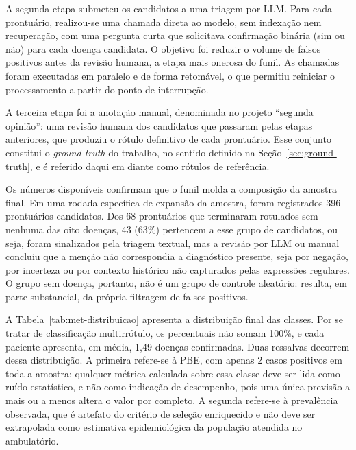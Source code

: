 A segunda etapa submeteu os candidatos a uma triagem por LLM. Para cada prontuário, realizou-se uma chamada direta ao modelo, sem indexação nem recuperação, com uma pergunta curta que solicitava confirmação binária (sim ou não) para cada doença candidata. O objetivo foi reduzir o volume de falsos positivos antes da revisão humana, a etapa mais onerosa do funil. As chamadas foram executadas em paralelo e de forma retomável, o que permitiu reiniciar o processamento a partir do ponto de interrupção.

A terceira etapa foi a anotação manual, denominada no projeto ``segunda opinião'': uma revisão humana dos candidatos que passaram pelas etapas anteriores, que produziu o rótulo definitivo de cada prontuário. Esse conjunto constitui o \textit{ground truth} do trabalho, no sentido definido na Seção~\ref{sec:ground-truth}, e é referido daqui em diante como rótulos de referência.

Os números disponíveis confirmam que o funil molda a composição da amostra final. Em uma rodada específica de expansão da amostra, foram registrados 396 prontuários candidatos. Dos 68 prontuários que terminaram rotulados sem nenhuma das oito doenças, 43 (63\%) pertencem a esse grupo de candidatos, ou seja, foram sinalizados pela triagem textual, mas a revisão por LLM ou manual concluiu que a menção não correspondia a diagnóstico presente, seja por negação, por incerteza ou por contexto histórico não capturados pelas expressões regulares. O grupo sem doença, portanto, não é um grupo de controle aleatório: resulta, em parte substancial, da própria filtragem de falsos positivos.

A Tabela~\ref{tab:met-distribuicao} apresenta a distribuição final das classes. Por se tratar de classificação multirrótulo, os percentuais não somam 100\%, e cada paciente apresenta, em média, 1,49 doenças confirmadas. Duas ressalvas decorrem dessa distribuição. A primeira refere-se à PBE, com apenas 2 casos positivos em toda a amostra: qualquer métrica calculada sobre essa classe deve ser lida como ruído estatístico, e não como indicação de desempenho, pois uma única previsão a mais ou a menos altera o valor por completo. A segunda refere-se à prevalência observada, que é artefato do critério de seleção enriquecido e não deve ser extrapolada como estimativa epidemiológica da população atendida no ambulatório.


